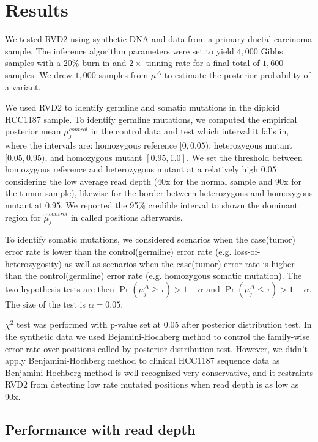 \documentclass{bioinfo}
\begin{document}
\section{Results}


We tested RVD2 using synthetic DNA and data from a primary ductal carcinoma sample. The inference algorithm parameters were set to yield $4,000$ Gibbs samples with a 20\% burn-in and $2\times$ tinning rate for a final total of $1,600$ samples. We drew $1,000$ samples from $\mu^{\Delta}$ to estimate the posterior probability of a variant.

We used RVD2 to identify germline and somatic mutations in the diploid HCC1187 sample. To identify germline mutations, we computed the empirical posterior mean $ \bar{\mu}_j^{control} $ in the control data and test which interval it falls in, where the intervals are: homozygous reference $[0, 0.05)$, heterozygous mutant $[0.05, 0.95)$, and homozygous mutant $[0.95, 1.0]$. We set the threshold between homozygous reference and heterozygous mutant at a relatively high 0.05 considering the low average read depth (40x for the normal sample and 90x for the tumor sample), likewise for the border between heterozygous and homozygous mutant at 0.95. We reported the 95\% credible interval to shown the dominant region for $ \hat{\mu}_j^{control} $ in called positions afterwards.

To identify somatic mutations, we considered scenarios when the case(tumor) error rate is lower than the control(germline) error rate (e.g. loss-of-heterozygosity) as well as scenarios when the case(tumor) error rate is higher than the control(germline) error rate (e.g. homozygous somatic mutation). The two hypothesis tests are then $\Pr( \mu_j^{\Delta} \geq \tau ) > 1-\alpha$ and $\Pr( \mu_j^{\Delta} \leq \tau ) > 1-\alpha$. The size of the test is $\alpha=0.05$. 

$ \chi^2 $ test was performed with p-value set at 0.05 after posterior distribution test. In the synthetic data we used Bejamini-Hochberg method to control the family-wise error rate over positions called by posterior distribution test. However, we didn't apply Benjamini-Hochberg method to clinical HCC1187 sequence data as Benjamini-Hochberg method is well-recognized very conservative, and it restraints RVD2 from detecting low rate mutated positions when read depth is as low as 90x.




\subsection{Performance with read depth}\label{sec:read_depth}
\end{document}
